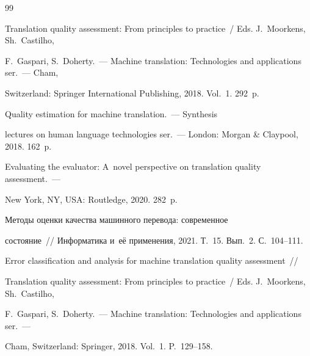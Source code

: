 {\small\frenchspacing


{%




\begin{thebibliography}{99}





\vspace*{-2pt}










Translation quality assessment: From principles to practice~/ Eds. J.~Moorkens, Sh.~Castilho, 


F.~Gaspari, S.~Doherty.~--- Machine translation: Technologies and applications ser.~--- Cham, 


Switzerland: Springer International Publishing, 2018. Vol.~1. 292~p.




 Quality estimation for machine translation.~--- Synthesis 


lectures on human language technologies ser.~--- London: Morgan \& Claypool, 2018. 162~p.




 Evaluating the evaluator: A~novel perspective on translation quality assessment.~--- 


New York, NY, USA: Routledge, 2020. 282~p.




 Методы оценки качества машинного перевода: современное 


состояние~/\!\!/ Информатика и~её применения, 2021. Т.~15. Вып.~2. С.~104--111.




 Error classification and analysis for machine translation quality assessment~/\!\!/ 


Translation quality assessment: From principles to practice~/ Eds. J.~Moorkens, Sh.~Castilho, 


F.~Gaspari, S.~Doherty.~--- Machine translation: Technologies and applications ser.~---


Cham, Switzerland: Springer, 2018. Vol.~1. P.~129--158.





\end{thebibliography}}}
